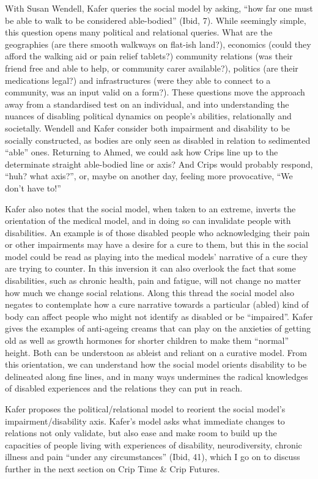With Susan Wendell, Kafer queries the social model by asking, ``how far
one must be able to walk to be considered able-bodied'' (Ibid, 7). While
seemingly simple, this question opens many political and relational
queries. What are the geographies (are there smooth walkways on flat-ish
land?), economics (could they afford the walking aid or pain relief
tablets?) community relations (was their friend free and able to help,
or community carer available?), politics (are their medications legal?)
and infrastructures (were they able to connect to a community, was an
input valid on a form?). These questions move the approach away from a
standardised test on an individual, and into understanding the nuances
of disabling political dynamics on people's abilities, relationally and
societally. Wendell and Kafer consider both impairment and disability to
be socially constructed, as bodies are only seen as disabled in relation
to sedimented ``able'' ones. Returning to Ahmed, we could ask how Crips
line up to the determinate straight able-bodied line or axis? And Crips
would probably respond, ``huh? what axis?'', or, maybe on another day,
feeling more provocative, ``We don't have to!''

Kafer also notes that the social model, when taken to an extreme,
inverts the orientation of the medical model, and in doing so can
invalidate people with disabilities. An example is of those disabled
people who acknowledging their pain or other impairments may have a
desire for a cure to them, but this in the social model could be read as
playing into the medical models' narrative of a cure they are trying to
counter. In this inversion it can also overlook the fact that some
disabilities, such as chronic health, pain and fatigue, will not change
no matter how much we change social relations. Along this thread the
social model also negates to contemplate how a cure narrative towards a
particular (abled) kind of body can affect people who might not identify
as disabled or be ``impaired''. Kafer gives the examples of anti-ageing
creams that can play on the anxieties of getting old as well as growth
hormones for shorter children to make them ``normal'' height. Both can
be understoon as ableist and reliant on a curative model. From this
orientation, we can understand how the social model orients disability
to be delineated along fine lines, and in many ways undermines the
radical knowledges of disabled experiences and the relations they can
put in reach.

Kafer proposes the political/relational model to reorient the social
model's impairment/disability axis. Kafer's model asks what immediate
changes to relations not only validate, but also ease and make room to
build up the capacities of people living with experiences of disability,
neurodiversity, chronic illness and pain ``under any circumstances''
(Ibid, 41), which I go on to discuss further in the next section on Crip
Time \& Crip Futures.

